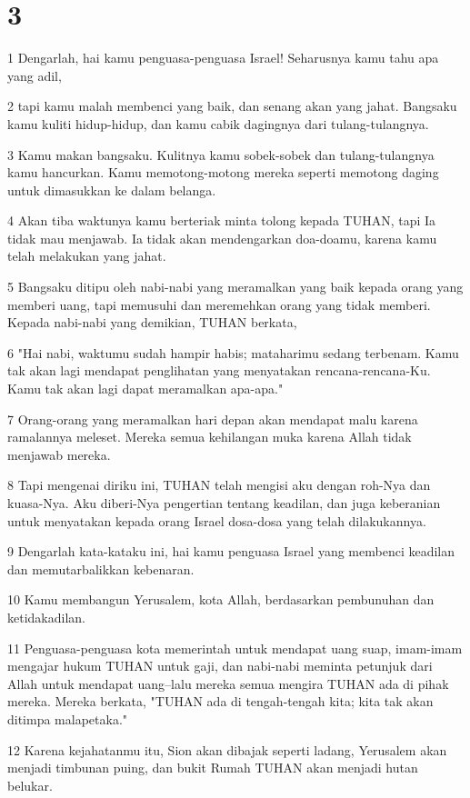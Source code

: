 \chapter{3}

\par 1 Dengarlah, hai kamu penguasa-penguasa Israel! Seharusnya kamu tahu apa yang adil,
\par 2 tapi kamu malah membenci yang baik, dan senang akan yang jahat. Bangsaku kamu kuliti hidup-hidup, dan kamu cabik dagingnya dari tulang-tulangnya.
\par 3 Kamu makan bangsaku. Kulitnya kamu sobek-sobek dan tulang-tulangnya kamu hancurkan. Kamu memotong-motong mereka seperti memotong daging untuk dimasukkan ke dalam belanga.
\par 4 Akan tiba waktunya kamu berteriak minta tolong kepada TUHAN, tapi Ia tidak mau menjawab. Ia tidak akan mendengarkan doa-doamu, karena kamu telah melakukan yang jahat.
\par 5 Bangsaku ditipu oleh nabi-nabi yang meramalkan yang baik kepada orang yang memberi uang, tapi memusuhi dan meremehkan orang yang tidak memberi. Kepada nabi-nabi yang demikian, TUHAN berkata,
\par 6 "Hai nabi, waktumu sudah hampir habis; mataharimu sedang terbenam. Kamu tak akan lagi mendapat penglihatan yang menyatakan rencana-rencana-Ku. Kamu tak akan lagi dapat meramalkan apa-apa."
\par 7 Orang-orang yang meramalkan hari depan akan mendapat malu karena ramalannya meleset. Mereka semua kehilangan muka karena Allah tidak menjawab mereka.
\par 8 Tapi mengenai diriku ini, TUHAN telah mengisi aku dengan roh-Nya dan kuasa-Nya. Aku diberi-Nya pengertian tentang keadilan, dan juga keberanian untuk menyatakan kepada orang Israel dosa-dosa yang telah dilakukannya.
\par 9 Dengarlah kata-kataku ini, hai kamu penguasa Israel yang membenci keadilan dan memutarbalikkan kebenaran.
\par 10 Kamu membangun Yerusalem, kota Allah, berdasarkan pembunuhan dan ketidakadilan.
\par 11 Penguasa-penguasa kota memerintah untuk mendapat uang suap, imam-imam mengajar hukum TUHAN untuk gaji, dan nabi-nabi meminta petunjuk dari Allah untuk mendapat uang--lalu mereka semua mengira TUHAN ada di pihak mereka. Mereka berkata, "TUHAN ada di tengah-tengah kita; kita tak akan ditimpa malapetaka."
\par 12 Karena kejahatanmu itu, Sion akan dibajak seperti ladang, Yerusalem akan menjadi timbunan puing, dan bukit Rumah TUHAN akan menjadi hutan belukar.


